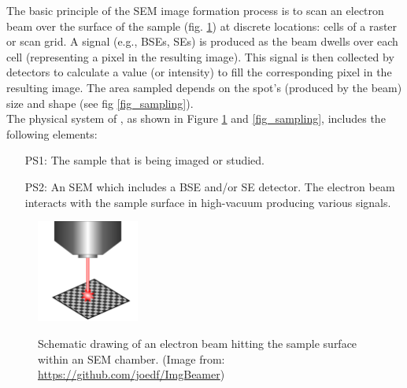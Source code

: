 \documentclass[12pt]{article}
\begin{document}
The basic principle of the SEM image formation process is to scan an electron beam over the surface 
of the sample (fig. \ref{fig_ebeam}) at discrete locations: cells of a raster or scan grid. A signal (e.g., BSEs, SEs) is 
produced as the beam dwells over each cell (representing a pixel in the resulting image). This 
signal is then collected by detectors to calculate a value (or intensity) to fill the corresponding
pixel in the resulting image. The area sampled depends on the spot's (produced by the beam) size and 
shape (see fig \ref{fig_sampling}). \\

The physical system of \progname{}, as shown in Figure \ref{fig_ebeam} and \ref{fig_sampling},
includes the following elements:

\begin{itemize}

\item[PS1:] The sample that is being imaged or studied.

\item[PS2:] An SEM which includes a BSE and/or SE detector. The electron beam interacts with the sample surface in high-vacuum producing various signals.

\end{itemize}

\setlength{\belowcaptionskip}{-30pt}
\begin{figure}[h!]
\begin{center}
{
 \includegraphics[width=0.3\textwidth]{figures/e_beam.png}
}
\caption{\label{fig_ebeam} Schematic drawing of an electron beam hitting the sample surface within an SEM chamber. (Image from: \url{https://github.com/joedf/ImgBeamer})}
\end{center}
\end{figure}
\setlength{\belowcaptionskip}{10pt}
\end{document}
